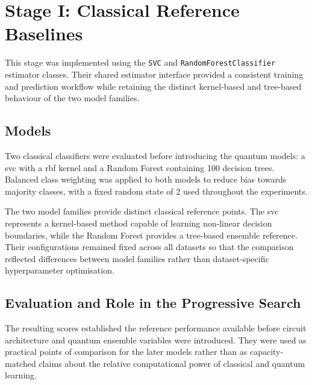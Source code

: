 \documentclass[]{UCD_CS_MSc_AAI_Report}
\begin{document}
\section{Stage I: Classical Reference Baselines}
\label{sec:method-classical-baselines}

This stage was implemented using the \texttt{SVC} and \texttt{RandomForestClassifier} estimator classes. Their shared estimator interface provided a consistent training and prediction workflow while retaining the distinct kernel-based and tree-based behaviour of the two model families.

\subsection{Models}

Two classical classifiers were evaluated before introducing the quantum models: a \ac{svc} with a \ac{rbf} kernel and a Random Forest containing 100 decision trees. Balanced class weighting was applied to both models to reduce bias towards majority classes, with a fixed random state of 2 used throughout the experiments.

The two model families provide distinct classical reference points. The \ac{svc} represents a kernel-based method capable of learning non-linear decision boundaries, while the Random Forest provides a tree-based ensemble reference. Their configurations remained fixed across all datasets so that the comparison reflected differences between model families rather than dataset-specific hyperparameter optimisation.

\subsection{Evaluation and Role in the Progressive Search}

The resulting scores established the reference performance available before circuit architecture and quantum ensemble variables were introduced. They were used as practical points of comparison for the later models rather than as capacity-matched claims about the relative computational power of classical and quantum learning.

\end{document}
